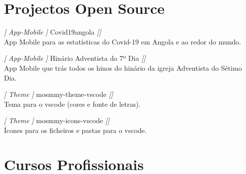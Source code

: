 \section{Projectos Open Source}
\begin{entrada}
  \project
  { \emph{[ App-Mobile ]} }
  {Covid19angola}
  {\textsf{\emph{[]}}\\
  \small{App Mobile para as estatísticas do Covid-19 em Angola e ao redor do mundo.}}

  \project
  { \emph{[ App-Mobile ]} }
  {Hinário Adventista do 7º Dia}
  {\textsf{\emph{[]}}\\
  \small{App Mobile que trás todos os hinos do hinário da igreja Adventista do Sétimo Dia.}}

  \project
  { \emph{[ Theme ]} }
  {mosmmy-theme-vscode}
  {\textsf{\emph{[]}}\\
  \small{Tema para o vscode (cores e fonte de letras).}}

  \project
  { \emph{[ Theme ]} }
  {mosmmy-icons-vscode}
  {\textsf{\emph{[]}}\\
  \small{Ícones para os ficheiros e pastas para o vscode.}}

\end{entrada}
\section{Cursos Profissionais}

